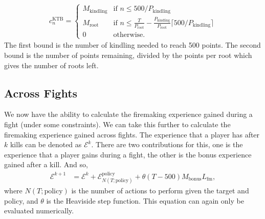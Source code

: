 		\begin{align}
			c_n^\text{KTB} = \begin{cases}
				M_\text{kindling} &\text{if } n \le 500/P_\text{kindling}\\
				M_\text{root} &\text{if } n \le \frac{T}{P_\text{root}} - \frac{P_\text{kindling}}{P_\text{root}}\lceil 500/P_\text{kindling} \rceil \\
				0 & \text{otherwise}.
			\end{cases}
		\end{align}
		The first bound is the number of kindling needed to reach 500 points. The second bound is the number of points remaining, divided by the points per root which gives the number of roots left.


	\subsection{Across Fights}
		We now have the ability to calculate the firemaking experience gained during a fight (under some constraints). We can take this further to calculate the firemaking experience gained across fights. The experience that a player has after $k$ kills can be denoted as $\mathcal{E}^k$. There are two contributions for this, one is the experience that a player gains during a fight, the other is the bonus experience gained after a kill. And so,
		\begin{align}
			\mathcal{E}^{k+1} &= \mathcal{E}^k + \mathcal{E}_{N(T; \text{policy})}^\text{policy} + \theta(T - 500)M_\text{bonus}L_\text{fm},
		\end{align}
		where $N(T; \text{policy})$ is the number of actions to perform given the target and policy, and $\theta$ is the Heaviside step function. This equation can again only be evaluated numerically. 
